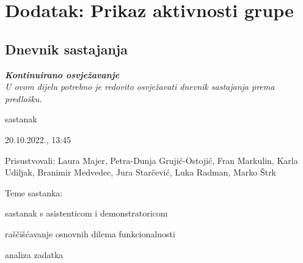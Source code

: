 \chapter*{Dodatak: Prikaz aktivnosti grupe}
		
		\section*{Dnevnik sastajanja}
		
		\textbf{\textit{Kontinuirano osvježavanje}}\\
		
		 \textit{U ovom dijelu potrebno je redovito osvježavati dnevnik sastajanja prema predlošku.}
		
		\begin{packed_enum}
			\item  sastanak
			
			\item[] \begin{packed_item}
				\item 20.10.2022., 13:45
				\item Prisustvovali: Laura Majer, Petra-Dunja Grujić-Ostojić, Fran Markulin, Karla Udiljak, Branimir Medvedec, Jura Starčević, Luka Radman, Marko Štrk
				\item Teme sastanka: 
				\begin{packed_item}
					\item  sastanak s asistenticom i demonstratoricom
					\item  raščišćavanje osnovnih dilema funkcionalnosti
					\item  analiza zadatka
				\end{packed_item}
			\end{packed_item}
			

\end{packed_enum}
